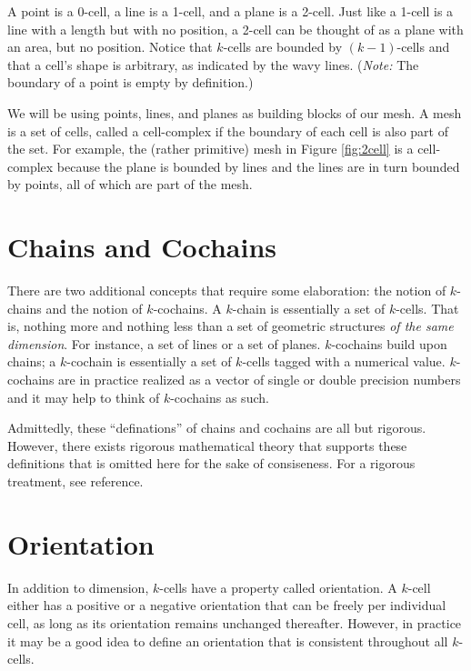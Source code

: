 A point is a 0-cell, a line is a 1-cell, and a plane is a 2-cell. Just like a 1-cell is a line with a length but with no position, a 2-cell can be thought of as a plane with an area, but no position. Notice that $k$-cells are bounded by $(k-1)$-cells and that a cell's shape is arbitrary, as indicated by the wavy lines. (\textit{Note:} The boundary of a point is empty by definition.)

We will be using points, lines, and planes as building blocks of our mesh. A mesh is a set of cells, called a cell-complex if the boundary of each cell is also part of the set. For example, the (rather primitive) mesh in Figure \ref{fig:2cell} is a cell-complex because the plane is bounded by lines and the lines are in turn bounded by points, all of which are part of the mesh.

\section{Chains and Cochains}

There are two additional concepts that require some elaboration: the notion of $k$-chains and the notion of $k$-cochains. A $k$-chain is essentially a set of $k$-cells. That is, nothing more and nothing less than a set of geometric structures \emph{of the same dimension}. For instance, a set of lines or a set of planes. $k$-cochains build upon chains; a $k$-cochain is essentially a set of $k$-cells tagged with a numerical value. $k$-cochains are in practice realized as a vector of single or double precision numbers and it may help to think of $k$-cochains as such.

Admittedly, these ``definations'' of chains and cochains are all but rigorous. However, there exists rigorous mathematical theory that supports these definitions that is omitted here for the sake of consiseness. For a rigorous treatment, see reference.


\section{Orientation}

In addition to dimension, $k$-cells have a property called orientation. A $k$-cell either has a positive or a negative orientation that can be freely per individual cell, as long as its orientation remains unchanged thereafter. However, in practice it may be a good idea to define an orientation that is consistent throughout all $k$-cells.

